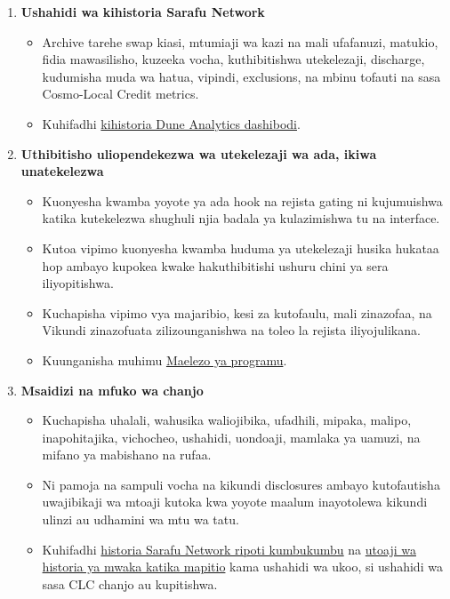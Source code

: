\documentclass[11pt]{article}
\begin{document}
\begin{enumerate}[leftmargin=*]
\item \textbf{Ushahidi wa kihistoria Sarafu Network}
\begin{itemize}[leftmargin=*]
\item Archive tarehe swap kiasi, mtumiaji wa kazi na mali ufafanuzi, matukio, fidia mawasilisho, kuzeeka vocha, kuthibitishwa utekelezaji, discharge, kudumisha muda wa hatua, vipindi, exclusions, na mbinu tofauti na sasa Cosmo-Local Credit metrics.
\item Kuhifadhi \href{https://dune.com/grassrootseconomics/sarafu-network}{kihistoria Dune Analytics dashibodi}.
\end{itemize}
\item \textbf{Uthibitisho uliopendekezwa wa utekelezaji wa ada, ikiwa unatekelezwa}
\begin{itemize}[leftmargin=*]
\item Kuonyesha kwamba yoyote ya ada hook na rejista gating ni kujumuishwa katika kutekelezwa shughuli njia badala ya kulazimishwa tu na interface.
\item Kutoa vipimo kuonyesha kwamba huduma ya utekelezaji husika hukataa hop ambayo kupokea kwake hakuthibitishi ushuru chini ya sera iliyopitishwa.
\item Kuchapisha vipimo vya majaribio, kesi za kutofaulu, mali zinazofaa, na Vikundi zinazofuata zilizounganishwa na toleo la rejista iliyojulikana.
\item Kuunganisha muhimu \href{https://software.grassecon.org}{Maelezo ya programu}.
\end{itemize}
\item \textbf{Msaidizi na mfuko wa chanjo}
\begin{itemize}[leftmargin=*]
\item Kuchapisha uhalali, wahusika waliojibika, ufadhili, mipaka, malipo, inapohitajika, vichocheo, ushahidi, uondoaji, mamlaka ya uamuzi, na mifano ya mabishano na rufaa.
\item Ni pamoja na sampuli vocha na kikundi disclosures ambayo kutofautisha uwajibikaji wa mtoaji kutoka kwa yoyote maalum inayotolewa kikundi ulinzi au udhamini wa mtu wa tatu.
\item Kuhifadhi \href{https://sarafu.network/reports}{historia Sarafu Network ripoti kumbukumbu} na \href{https://youtu.be/5yGaP31bvs0?si=fZ-AMTEXsmVR8Ulv}{utoaji wa historia ya mwaka katika mapitio} kama ushahidi wa ukoo, si ushahidi wa sasa CLC chanjo au kupitishwa.
\end{itemize}

\end{enumerate}
\end{document}

